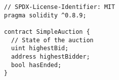 \begin{lstlisting}[language=Solidity]
// SPDX-License-Identifier: MIT
pragma solidity ^0.8.9;

contract SimpleAuction {
  // State of the auction
  uint highestBid;
  address highestBidder;
  bool hasEnded;
}
\end{lstlisting}